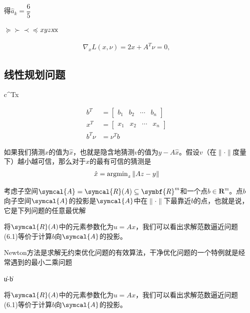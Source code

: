 \documentclass{lsbook}
\begin{document}


得$\hat{a}_k=\dfrac{6}{5}$

$\succeq\succ\prec\preceq$$xyz\textsl{x}\text{x}$

\begin{align*}
\nabla_xL(x,\nu) = 2x + A^T\nu = 0,
\end{align*}
\subsection{线性规划问题}

\begin{mini}[2]
	{}{c^Tx}
	{\label{eq:Ex1}}{}
\end{mini}


\begin{align*}
b^T &= \begin{bmatrix}
b_1 & b_2 & \cdots & b_n
\end{bmatrix}\\
x^T &= \begin{bmatrix}
x_1 & x_2 & \cdots & x_n
\end{bmatrix}\\
b^T\nu &= \nu^Tb
\end{align*}

如果我们猜测$x$的值为$\hat{x}$，也就是隐含地猜测$v$的值为$y-A\hat{x}$。假设$v$（在$\|\cdot\|$度量下）越小越可信，那么对于$x$的最有可信的猜测是
\begin{align}
\hat{x} = \operatorname{argmin}_z	\|Az - y\|
\end{align}

考虑子空间$\symcal{A} = \symcal{R}(A)\subseteq\symbf{R}^m$和一个点$b\in\symbf{R}^m$。点$b$向子空间$\symcal{A}$的\textsf{投影}是$\symcal{A}$中在$\|\cdot\|$下最靠近$b$的点，也就是说，它是下列问题的任意最优解



将$\symcal{R}(A)$中的元素参数化为$u=Ax$，我们可以看出求解范数逼近问题(6.1)等价于计算$b$向$\symcal{A}$的投影。

Newton方法是求解无约束优化问题的有效算法，干净优化问题的一个特例就是经常遇到的最小二乘问题



\begin{mini}[2]
	{}{\|u-b\|}
	{\label{eq:Ex1}}{}
\end{mini}
将$\symcal{R}(A)$中的元素参数化为$u=Ax$，我们可以看出求解范数逼近问题(6.1)等价于计算$b$向$\symcal{A}$的投影。
\end{document}
